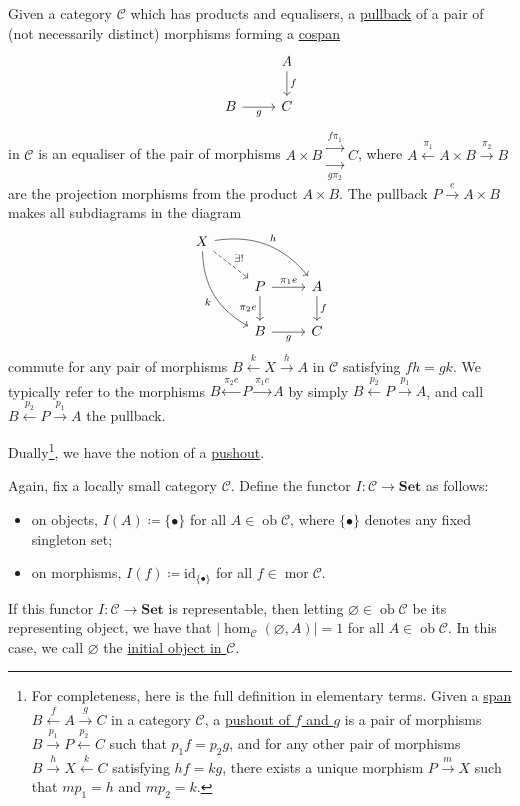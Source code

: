 \documentclass[a4paper,11pt]{article}
\theoremstyle{break_italics}
\theoremstyle{break_upright}
\theoremstyle{remark}
\newcommand{\id}{\mathrm{id}}
\newcommand{\ob}{\operatorname{ob}}
\newcommand{\mor}{\operatorname{mor}}
\newcommand{\C}{\mathcal{C}}
\newcommand{\Set}{\mathbf{Set}}
\begin{document}
Given a category $\C$ which has products and equalisers, a \uline{pullback} of a pair of (not necessarily distinct) morphisms forming a \uline{cospan}
\[
\begin{tikzcd}
                  & A \arrow[d, "f"] \\
B \arrow[r, "g"'] & C               
\end{tikzcd}
\]
in $\C$ is an equaliser of the pair of morphisms $A \times B \substack{\xrightarrow{f\pi_1} \\ \xrightarrow[g\pi_2]{}} C$, where $A \xleftarrow{\pi_1} A \times B \xrightarrow{\pi_2} B$ are the projection morphisms from the product $A \times B$. The pullback $P \xrightarrow{e} A \times B$ makes all subdiagrams in the diagram
\[
\begin{tikzcd}
X \arrow[rrd, "h", bend left] \arrow[rdd, "k"', bend right] \arrow[rd, "\exists!", dashed] &  & \\ & P \arrow[r, "\pi_1 e"] \arrow[d, "\pi_2 e"'] & A \arrow[d, "f"] \\ & B \arrow[r, "g"'] & C 
\end{tikzcd}
\]
commute for any pair of morphisms $B \xleftarrow{k} X \xrightarrow{h} A$ in $\C$ satisfying $fh = gk$. We typically refer to the morphisms $B \xleftarrow{\pi_2 e} P \xrightarrow{\pi_1 e} A$ by simply $B \xleftarrow{p_2} P \xrightarrow{p_1} A$, and call $B \xleftarrow{p_2} P \xrightarrow{p_1} A$ the pullback.

Dually\footnote{For completeness, here is the full definition in elementary terms. Given a \uline{span} $B \xleftarrow{f} A \xrightarrow{g} C$ in a category $\C$, a \uline{pushout of $f$ and $g$} is a pair of morphisms $B \xrightarrow{p_1} P \xleftarrow{p_2} C$ such that $p_1 f = p_2 g$, and for any other pair of morphisms $B \xrightarrow{h} X \xleftarrow{k} C$ satisfying $hf = kg$, there exists a unique morphism $P \xrightarrow{m} X$ such that $m p_1 = h$ and $m p_2 = k$.}, we have the notion of a \uline{pushout}.

Again, fix a locally small category $\C$. Define the functor $I \colon \C \to \Set$ as follows:
\begin{itemize}
	\item on objects, $I(A) \coloneqq \{\bullet\}$ for all $A \in \ob\C$, where $\{\bullet\}$ denotes any fixed singleton set;
	\item on morphisms, $I(f) \coloneqq \id_{\{\bullet\}}$ for all $f \in \mor\C$.
\end{itemize}
If this functor $I \colon \C \to \Set$ is representable, then letting $\varnothing \in \ob\C$ be its representing object, we have that $|\hom_\C(\varnothing, A)| = 1$ for all $A \in \ob\C$. In this case, we call $\varnothing$ the \uline{initial object in $\C$}.
\end{document}
